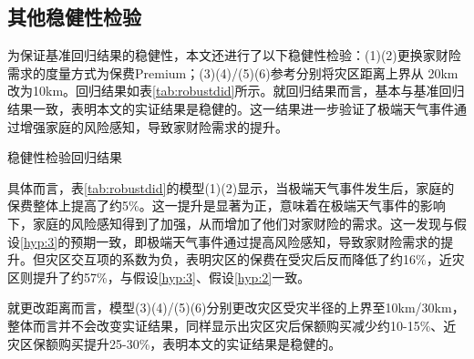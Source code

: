 \subsection{其他稳健性检验}

为保证基准回归结果的稳健性，本文还进行了以下稳健性检验：(1)(2)更换家财险需求的度量方式为保费Premium；(3)(4)/(5)(6)参考\citet{alok2020fund}分别将灾区距离上界从 20km 改为10km。回归结果如表\ref{tab:robustdid}所示。就回归结果而言，基本与基准回归结果一致，表明本文的实证结果是稳健的。这一结果进一步验证了极端天气事件通过增强家庭的风险感知，导致家财险需求的提升。
\begin{table}
    \centering
    \caption{稳健性检验回归结果}\label{tab:robustdid}
    
\end{table}

具体而言，表\ref{tab:robustdid}的模型(1)(2)显示，当极端天气事件发生后，家庭的保费整体上提高了约5\%。这一提升是显著为正，意味着在极端天气事件的影响下，家庭的风险感知得到了加强，从而增加了他们对家财险的需求。这一发现与假设\ref{hyp:3}的预期一致，即极端天气事件通过提高风险感知，导致家财险需求的提升。但灾区交互项的系数为负，表明灾区的保费在受灾后反而降低了约16\%，近灾区则提升了约57\%，与假设\ref{hyp:3}、假设\ref{hyp:2}一致。

就更改距离而言，模型(3)(4)/(5)(6)分别更改灾区受灾半径的上界至10km/30km，整体而言并不会改变实证结果，同样显示出灾区灾后保额购买减少约10-15\%、近灾区保额购买提升25-30\%，表明本文的实证结果是稳健的。
